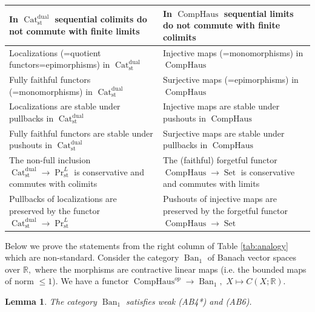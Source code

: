 \documentclass[11pt,leqno]{amsart}
\newtheorem{lemma}[theo]{Lemma}
\numberwithin{equation}{section}
\def\R{\mathbb{R}}
\newcommand{\comphaus}{\operatorname{CompHaus}}
\newcommand{\Cat}{\operatorname{Cat}}
\newcommand{\st}{\operatorname{st}}
\newcommand{\dual}{\operatorname{dual}}
\newcommand{\Ban}{\operatorname{Ban}}
\newcommand{\Set}{\operatorname{Set}}
\begin{document}
\begin{longtable}{ | m{20em} | m{20em} | }
\hline
In $\Cat_{\st}^{\dual}$ sequential colimits do not commute with finite limits & In $\comphaus$ sequential limits do not commute with finite colimits\\
\hline
Localizations (=quotient functors=epimorphisms) in $\Cat_{\st}^{\dual}$ & Injective maps (=monomorphisms) in $\comphaus$\\
\hline
Fully faithful functors (=monomorphisms) in $\Cat_{\st}^{\dual}$ & Surjective maps (=epimorphisms) in $\comphaus$\\
\hline
Localizations are stable under pullbacks in $\Cat_{\st}^{\dual}$ & Injective maps are stable under pushouts in $\comphaus$\\
\hline
Fully faithful functors are stable under pushouts in $\Cat_{\st}^{\dual}$ & Surjective maps are stable under pullbacks in $\comphaus$\\
\hline
The non-full inclusion $\Cat_{\st}^{\dual}\to\Pr^L_{\st}$ is conservative and commutes with colimits & The (faithful) forgetful functor $\comphaus\to\Set$ is conservative and commutes with limits\\
\hline
Pullbacks of localizations are preserved by the functor $\Cat_{\st}^{\dual}\to\Pr^L_{\st}$ & Pushouts of injective maps are preserved by the forgetful functor $\comphaus\to\Set$\\
\hline
\end{longtable}

Below we prove the statements from the right column of Table \ref{tab:analogy} which are non-standard. Consider the category $\Ban_1$ of Banach vector spaces over $\R,$ where the morphisms are contractive linear maps (i.e. the bounded maps of norm $\leq 1$). We have a functor $\comphaus^{op}\to\Ban_1,$ $X\mapsto C(X;\R).$

\begin{lemma}\label{lem:axioms_for_Ban_1} The category $\Ban_1$ satisfies weak (AB4*) and (AB6).\end{lemma}
\end{document}
